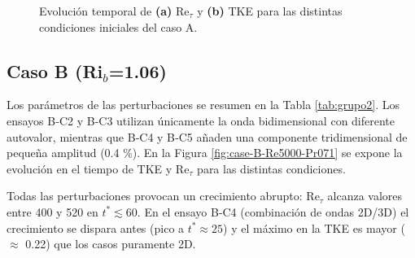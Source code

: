 \begin{figure}[H]
  \centering  

  \caption{Evolución temporal de \textbf{(a)} Re$_{\tau}$ y \textbf{(b)} TKE para las distintas condiciones iniciales del caso A.}
  \label{fig:case-A-Re5000-Pr071}
\end{figure}



\subsection{Caso B (Ri$_b$=1.06)}

Los parámetros de las perturbaciones se resumen en la Tabla \ref{tab:grupo2}. Los ensayos B‑C2 y B‑C3 utilizan únicamente la onda bidimensional con diferente autovalor, mientras que B‑C4 y B‑C5 añaden una componente tridimensional de pequeña amplitud (0.4 \%). En la Figura \ref{fig:case-B-Re5000-Pr071} se expone la evolución en el tiempo de TKE y Re$_{\tau}$ para las distintas condiciones.  

Todas las perturbaciones provocan un crecimiento abrupto: Re$_{\tau}$ alcanza valores entre 400 y 520 en $t^*\lesssim 60$. En el ensayo B‑C4 (combinación de ondas 2D/3D) el crecimiento se dispara antes (pico a $t^*\approx 25$) y el máximo en la TKE es mayor ($\approx$ 0.22) que los casos puramente 2D.


